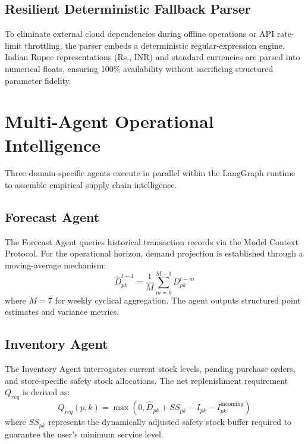 \documentclass[conference]{IEEEtran}
\begin{document}
\subsection{Resilient Deterministic Fallback Parser}
To eliminate external cloud dependencies during offline operations or API rate-limit throttling, the parser embeds a deterministic regular-expression engine. Indian Rupee representations (Rs., INR) and standard currencies are parsed into numerical floats, ensuring 100\% availability without sacrificing structured parameter fidelity.

\section{Multi-Agent Operational Intelligence}
Three domain-specific agents execute in parallel within the LangGraph runtime to assemble empirical supply chain intelligence.

\subsection{Forecast Agent}
The Forecast Agent queries historical transaction records via the Model Context Protocol. For the operational horizon, demand projection is established through a moving-average mechanism:
\begin{equation}
\hat{D}_{pk}^{t+1} = \frac{1}{M} \sum_{m=0}^{M-1} D_{pk}^{t-m}
\label{eq:forecast}
\end{equation}
where $M = 7$ for weekly cyclical aggregation. The agent outputs structured point estimates and variance metrics.

\subsection{Inventory Agent}
The Inventory Agent interrogates current stock levels, pending purchase orders, and store-specific safety stock allocations. The net replenishment requirement $Q_{req}$ is derived as:
\begin{equation}
Q_{req}(p, k) = \max\left(0, \hat{D}_{pk} + SS_{pk} - I_{pk} - I_{pk}^{\text{incoming}}\right)
\label{eq:replenishment}
\end{equation}
where $SS_{pk}$ represents the dynamically adjusted safety stock buffer required to guarantee the user's minimum service level.
\end{document}

